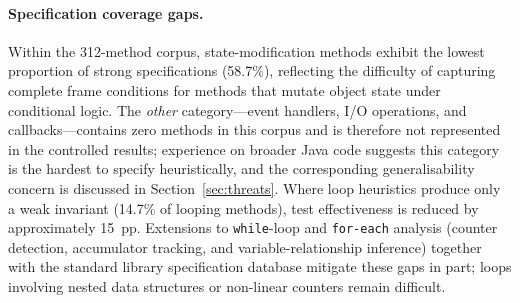 \paragraph{Specification coverage gaps.} Within the 312-method corpus, state-modification methods exhibit the lowest proportion of strong specifications (58.7\%), reflecting the difficulty of capturing complete frame conditions for methods that mutate object state under conditional logic. The \emph{other} category---event handlers, I/O operations, and callbacks---contains zero methods in this corpus and is therefore not represented in the controlled results; experience on broader Java code suggests this category is the hardest to specify heuristically, and the corresponding generalisability concern is discussed in Section~\ref{sec:threats}. Where loop heuristics produce only a weak invariant (14.7\% of looping methods), test effectiveness is reduced by approximately 15~pp. Extensions to \texttt{while}-loop and \texttt{for-each} analysis (counter detection, accumulator tracking, and variable-relationship inference) together with the standard library specification database mitigate these gaps in part; loops involving nested data structures or non-linear counters remain difficult.

